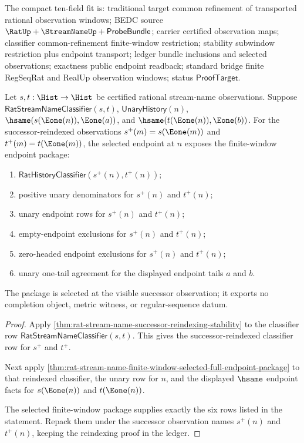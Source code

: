 The compact ten-field fit is: traditional target common refinement of
transported rational observation windows; BEDC source
$\RatUp+\StreamNameUp+\mathsf{ProbeBundle}$; carrier certified observation
maps; classifier common-refinement finite-window restriction; stability
subwindow restriction plus endpoint transport; ledger bundle inclusions and
selected observations; exactness public endpoint readback; standard bridge
finite RegSeqRat and RealUp observation windows; status $\mathsf{ProofTarget}$.

\begin{theorem}
\label{thm:streamname-successor-reindexed-selected-endpoint-package}
Let $s,t:\Hist\to\Hist$ be certified rational stream-name observations. Suppose
$\mathsf{RatStreamNameClassifier}(s,t)$, $\mathsf{UnaryHistory}(n)$,
$\hsame(s(\Eone(n)),\Eone(a))$, and
$\hsame(t(\Eone(n)),\Eone(b))$. For the successor-reindexed observations
$s^{+}(m)=s(\Eone(m))$ and $t^{+}(m)=t(\Eone(m))$, the selected endpoint at
$n$ exposes the finite-window endpoint package:
\begin{enumerate}
  \item $\mathsf{RatHistoryClassifier}(s^{+}(n),t^{+}(n))$;
  \item positive unary denominators for $s^{+}(n)$ and $t^{+}(n)$;
  \item unary endpoint rows for $s^{+}(n)$ and $t^{+}(n)$;
  \item empty-endpoint exclusions for $s^{+}(n)$ and $t^{+}(n)$;
  \item zero-headed endpoint exclusions for $s^{+}(n)$ and $t^{+}(n)$;
  \item unary one-tail agreement for the displayed endpoint tails $a$ and $b$.
\end{enumerate}
The package is selected at the visible successor observation; it exports no
completion object, metric witness, or regular-sequence datum.
\end{theorem}
\begin{proof}
Apply
\autoref{thm:rat-stream-name-successor-reindexing-stability} to the
classifier row $\mathsf{RatStreamNameClassifier}(s,t)$. This gives the
successor-reindexed classifier row for $s^{+}$ and $t^{+}$.

Next apply
\autoref{thm:rat-stream-name-finite-window-selected-full-endpoint-package} to
that reindexed classifier, the unary row for $n$, and the displayed
$\hsame$ endpoint facts for $s(\Eone(n))$ and $t(\Eone(n))$.

The selected finite-window package supplies exactly the six rows listed in
the statement. Repack them under the successor observation names
$s^{+}(n)$ and $t^{+}(n)$, keeping the reindexing proof in the ledger.
\end{proof}

